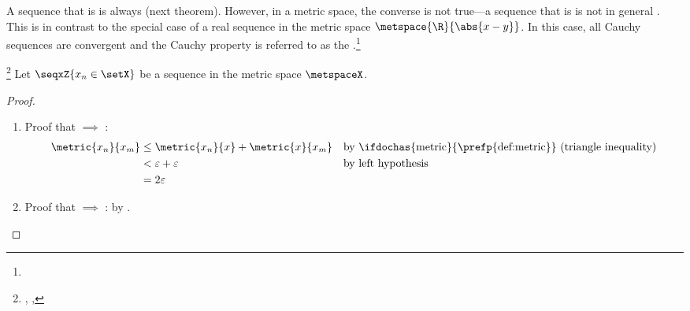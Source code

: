 A sequence that is  is always  (next theorem).
However, in a metric space, the converse is not true---a sequence that is  is not in general .
This is in contrast to the special case of a real sequence in the metric space $\metspace{\R}{\abs{x-y}}$. %
In this case, all Cauchy sequences are convergent and the Cauchy property is referred to as the 
.\footnote{
  }
\begin{theorem}
\footnote{
  ,
  ,
  }
\label{thm:convergent==>cauchy}
Let $\seqxZ{x_n\in\setX}$ be a sequence in the metric space $\metspaceX$.
\end{theorem}
\begin{proof}
\begin{enumerate}
  \item Proof that  $\implies$ :
    \begin{align*}
      \metric{x_n}{x_m}
        &\le \metric{x_n}{x} + \metric{x}{x_m}
        &&   \text{by \ifdochas{metric}{\prefp{def:metric}} (triangle inequality)}
      \\&<   \varepsilon + \varepsilon
        &&   \text{by left hypothesis}
      \\&=   2\varepsilon
    \end{align*}

  \item Proof that  $\implies$ : by .

\end{enumerate}
\end{proof}


